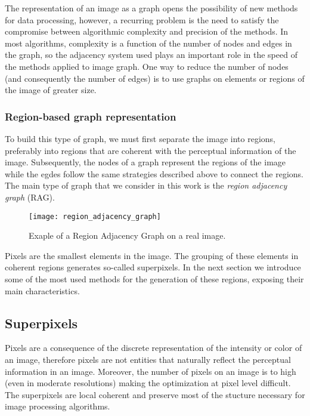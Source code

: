 The representation of an image as a graph opens the possibility of new methods for data processing, however, a recurring problem is the need to satisfy the compromise between algorithmic complexity and precision of the methods. In most algorithms, complexity is a function of the number of nodes and edges in the graph, so the adjacency system used plays an important role in the speed of the methods applied to image graph. One way to reduce the number of nodes (and consequently the number of edges) is to use graphs on elements or regions of the image of greater size.

\subsubsection{Region-based graph representation}

To build this type of graph, we must first separate the image into regions, preferably into regions that are coherent with the perceptual information of the image. Subsequently, the nodes of a graph represent the regions of the image while the egdes follow the same strategies described above to connect the regions. The main type of graph that we consider in this work is the \textit{region adjacency graph }(RAG).


\begin{figure}[!ht]
	\centering
	\texttt{[image: region\_adjacency\_graph]}       	    
    \caption{Exaple of a Region Adjacency Graph on a real image.}\label{fig:region_adjacency_graph}    
\end{figure}


Pixels are the smallest elements in the image. The grouping of these elements in coherent regions generates so-called superpixels. In the next section we introduce some of the most used methods for the generation of these regions, exposing their main characteristics.


\subsection{Superpixels}

Pixels are a consequence of the discrete representation of the intensity or color of an image, therefore pixels are not entities that naturally reflect the perceptual information in an image. Moreover, the number of pixels on an image is to high (even in moderate resolutions) making the optimization at pixel level difficult. The superpixels are local coherent and preserve most of the stucture necessary for image processing algorithms.

